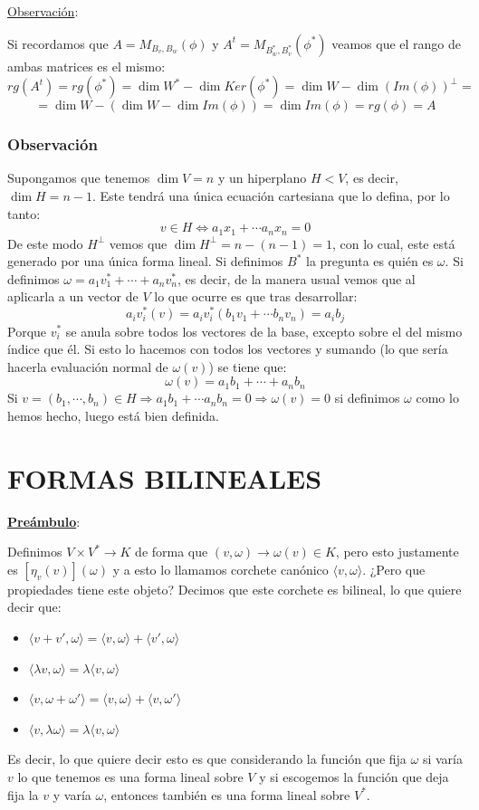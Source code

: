 \documentclass[10pt,a4paper,openright]{book}
\begin{document}
\underline{Observación}:

Si recordamos que $A=M_{B_v, B_w}(\phi)$ y $A^t=M_{B_w^*, B_v^*}(\phi^*)$ veamos que el rango de ambas matrices es el mismo:
$$rg(A^t)=rg(\phi^*)=\dim W^*-\dim Ker(\phi^*)=\dim W- \dim (Im(\phi))^\perp=$$
$$=\dim W- (\dim W-\dim Im(\phi))=\dim Im(\phi)=rg(\phi)=A$$

\subsubsection*{Observación}
Supongamos que tenemos $\dim V=n$ y un hiperplano $H<V$, es decir, $\dim H=n-1$. Este tendrá una única ecuación cartesiana que lo defina, por lo tanto:
$$v\in H\Leftrightarrow a_1x_1+\cdots a_nx_n=0$$
De este modo $H^\perp$ vemos que $\dim H^\perp = n-(n-1)=1$, con lo cual, este está generado por una única forma lineal. Si definimos $B^*$ la pregunta es quién es $\omega$. Si definimos $\omega=a_1v_1^*+\cdots + a_nv_n^*$, es decir, de la manera usual vemos que al aplicarla a un vector de $V$ lo que ocurre es que tras desarrollar:
$$a_iv_i^*(v) = a_iv_i^*(b_1v_1+\cdots b_nv_n)=a_ib_j$$
Porque $v_i^*$ se anula sobre todos los vectores de la base, excepto sobre el del mismo índice que él. Si esto lo hacemos con todos los vectores y sumando (lo que sería hacerla evaluación normal de $\omega(v)$) se tiene que:
$$\omega(v)=a_1b_1+\cdots +a_nb_n$$
Si $v=(b_1, \cdots, b_n)\in H\Rightarrow a_1b_1+\cdots a_nb_n=0\Rightarrow \omega(v)=0$ si definimos $\omega$ como lo hemos hecho, luego está bien definida.

\section*{FORMAS BILINEALES}
\underline{\textbf{Preámbulo}}:

Definimos $V\times V^* \rightarrow K$ de forma que $(v,\omega)\rightarrow \omega(v)\in K$, pero esto justamente es $\left[\eta_v(v)\right](\omega)$ y a esto lo llamamos corchete canónico $\langle v,\omega\rangle$. ¿Pero que propiedades tiene este objeto? Decimos que este corchete es bilineal, lo que quiere decir que:
\begin{itemize}
\item $\langle v+v',\omega\rangle=\langle v,\omega\rangle+\langle v',\omega\rangle$
\item $\langle\lambda v,\omega\rangle = \lambda \langle v,\omega\rangle$
\item $\langle v,\omega+\omega'\rangle =\langle v,\omega\rangle+\langle v,\omega'\rangle$
\item $\langle v,\lambda\omega\rangle = \lambda \langle v,\omega\rangle$
\end{itemize}
Es decir, lo que quiere decir esto es que considerando la función que fija $\omega$ si varía $v$ lo que tenemos es una forma lineal sobre $V$ y si escogemos la función que deja fija la $v$ y varía $\omega$, entonces también es una forma lineal sobre $V^*$.
\end{document}

